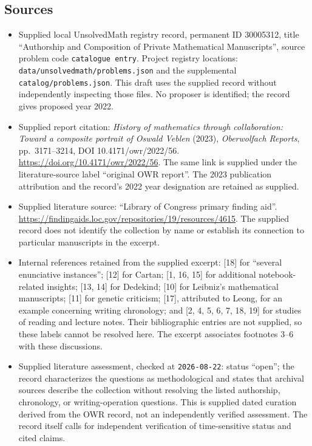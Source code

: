 \documentclass[11pt]{article}
\begin{document}
\subsection{Sources}
\begin{itemize}
\item Supplied local UnsolvedMath registry record, permanent ID 30005312, title ``Authorship and Composition of Private Mathematical Manuscripts'', source problem code \texttt{catalogue entry}. Project registry locations: \texttt{data/unsolvedmath/problems.json} and the supplemental \texttt{catalog/problems.json}. This draft uses the supplied record without independently inspecting those files. No proposer is identified; the record gives proposed year 2022.
\item Supplied report citation: \emph{History of mathematics through collaboration: Toward a composite portrait of Oswald Veblen} (2023), \emph{Oberwolfach Reports}, pp.\ 3171--3214, DOI 10.4171/owr/2022/56. \url{https://doi.org/10.4171/owr/2022/56}. The same link is supplied under the literature-source label ``original OWR report''. The 2023 publication attribution and the record's 2022 year designation are retained as supplied.
\item Supplied literature source: ``Library of Congress primary finding aid''. \url{https://findingaids.loc.gov/repositories/19/resources/4615}. The supplied record does not identify the collection by name or establish its connection to particular manuscripts in the excerpt.
\item Internal references retained from the supplied excerpt: [18] for ``several enunciative instances''; [12] for Cartan; [1, 16, 15] for additional notebook-related insights; [13, 14] for Dedekind; [10] for Leibniz's mathematical manuscripts; [11] for genetic criticism; [17], attributed to Leong, for an example concerning writing chronology; and [2, 4, 5, 6, 7, 18, 19] for studies of reading and lecture notes. Their bibliographic entries are not supplied, so these labels cannot be resolved here. The excerpt associates footnotes 3--6 with these discussions.
\item Supplied literature assessment, checked at \texttt{2026-08-22}: status ``open''; the record characterizes the questions as methodological and states that archival sources describe the collection without resolving the listed authorship, chronology, or writing-operation questions. This is supplied dated curation derived from the OWR record, not an independently verified assessment. The record itself calls for independent verification of time-sensitive status and cited claims.
\end{itemize}
\end{document}
